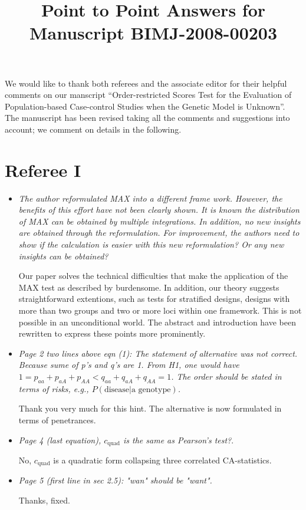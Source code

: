 \documentclass{article}
\title{Point to Point Answers for Manuscript BIMJ-2008-00203}
\begin{document}
\maketitle

We would like to thank both referees and the associate editor for
their helpful comments on our manscript ``Order-restricted Scores Test for
the Evaluation of Population-based Case-control Studies when the
Genetic Model is Unknown''. The manuscript has been revised taking all 
the comments and suggestions into account; we comment on details
in the following.

\section*{Referee I}

\begin{itemize}
\item \textit{The author reformulated MAX into a different frame work. 
However, the benefits of this effort have not been clearly shown. It is 
known the distribution of MAX can be obtained by multiple integrations. 
In addition, no new insights are obtained through the reformulation.
For improvement, the authors need to show if the calculation is easier 
with this new reformulation? Or any new insights can be obtained?}

Our paper solves the technical difficulties that make
the application of the MAX test as described by 
\cite{Freidlin:2002} burdensome. In addition, our theory
suggests straightforward extentions, such as
tests for stratified designs, designs with more than two
groups and two or more loci within one framework. This is not possible
in an unconditional world. The abstract and introduction have been rewritten
to express these points more prominently.

\item
\textit{Page 2 two lines above eqn (1): The statement of alternative was not 
correct. Because sume of p's and q's are 1. From H1, one would have 
$1 =p_{aa}+p_{aA}+p_{AA} < q_{aa}+q_{aA}+q_{AA}=1$. 
The order should be stated in terms of risks, e.g., $P(\text{disease}|\text{a
genotype})$.}

Thank you very much for this hint. The alternative is now formulated
in terms of penetrances.

\item
\textit{Page 4 (last equation), $c_\text{quad}$ is the same as Pearson's test?}.

No, $c_\text{quad}$ is a quadratic form collapsing three correlated 
CA-statistics.

\item
\textit{Page 5 (first line in sec 2.5): "wan" should be "want".}

Thanks, fixed.
\end{itemize}
\end{document}
